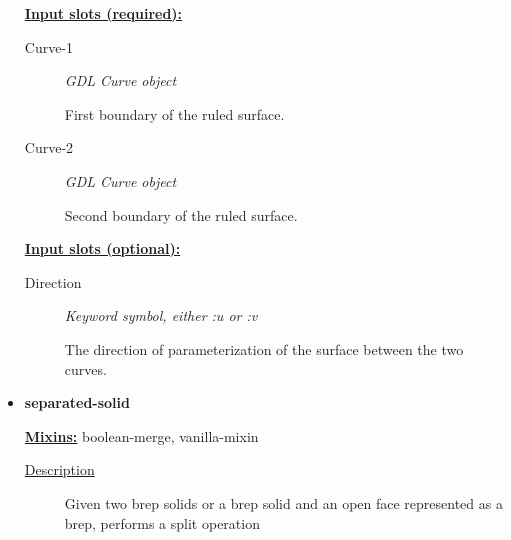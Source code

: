 \documentclass [11pt]{book}
\begin{document}
\begin{itemize}
\textbf{
\underline{Input slots (required):}}

\begin{description}

\item [Curve-1]
\emph{GDL Curve object}

 First boundary of the ruled surface.




\item [Curve-2]
\emph{GDL Curve object}

 Second boundary of the ruled surface.




\end{description}






\textbf{
\underline{Input slots (optional):}}

\begin{description}

\item [Direction]
\emph{Keyword symbol, either :u or :v}

 The direction of parameterization of the surface between the two curves.




\end{description}







\item {}
\label{prim:separated-solid}
\textbf{separated-solid}


\textbf{
\underline{Mixins:}} boolean-merge, vanilla-mixin





\begin{description}

\item [
\underline{Description}]


Given two brep solids or a brep solid and an open face represented as a brep,
performs a split operation



\end{description}









\end{itemize}
\end{document}
